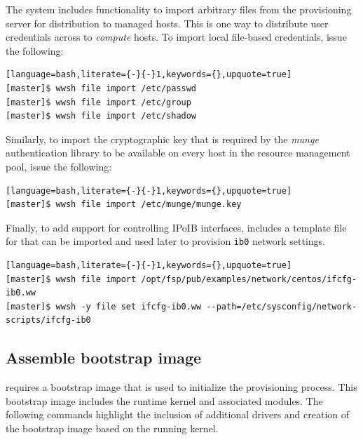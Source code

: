 \documentclass[letterpaper]{article}
\begin{document}
The \Warewulf{} system includes functionality to import arbitrary files from the
provisioning server for distribution to managed hosts. This is one way
to distribute user credentials across to {\em compute} hosts. To
import local file-based credentials, issue the following:

\begin{lstlisting}[language=bash,literate={-}{-}1,keywords={},upquote=true]
[master]$ wwsh file import /etc/passwd                                                                                                       
[master]$ wwsh file import /etc/group
[master]$ wwsh file import /etc/shadow 
\end{lstlisting}

Similarly, to import the cryptographic key that is required by the {\em munge}
authentication library to be available on every host in the resource management
pool, issue the following:

\begin{lstlisting}[language=bash,literate={-}{-}1,keywords={},upquote=true]
[master]$ wwsh file import /etc/munge/munge.key
\end{lstlisting}

Finally, to add support for controlling IPoIB interfaces, \FSP{} includes a
template file for \Warewulf{} that can be imported and used later to provision
\texttt{ib0} network settings.

\begin{lstlisting}[language=bash,literate={-}{-}1,keywords={},upquote=true]
[master]$ wwsh file import /opt/fsp/pub/examples/network/centos/ifcfg-ib0.ww
[master]$ wwsh -y file set ifcfg-ib0.ww --path=/etc/sysconfig/network-scripts/ifcfg-ib0
\end{lstlisting}


\subsection{Assemble bootstrap image}

\Warewulf{} requires a bootstrap image that is used to initialize the provisioning
process. This bootstrap image includes the runtime kernel and associated
modules. The following commands highlight the inclusion of additional drivers
and creation of the bootstrap image based on the running kernel.
\end{document}
